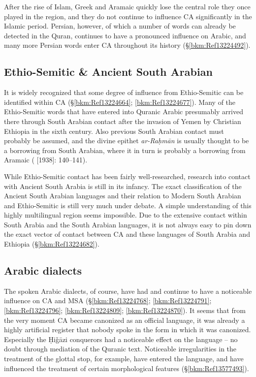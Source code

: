 \documentclass[output=paper]{langsci/langscibook}
\begin{document}
After the rise of Islam, Greek and Aramaic quickly lose the central role they once played in the region, and they do not continue to influence CA significantly in the Islamic period. Persian, however, of which a number of words can already be detected in the Quran, continues to have a pronounced influence on Arabic, and many more Persian words enter CA throughout its history (§\ref{bkm:Ref13224492}).

\subsection{Ethio-Semitic \& Ancient South Arabian}

It is widely recognized that some degree of influence from Ethio-Semitic can be identified within CA (§\ref{bkm:Ref13224664}; \ref{bkm:Ref13224677}). Many of the Ethio-Semitic words that have entered into Quranic Arabic presumably arrived there through South Arabian contact after the invasion of Yemen by Christian Ethiopia in the sixth century. Also previous South Arabian contact must probably be assumed, and the divine epithet \textit{ar-Raḥmān} is usually thought to be a borrowing from South Arabian, where it in turn is probably a borrowing from Aramaic (\citealt{Jeffrey2007} [1938]: 140--141). 

While Ethio-Semitic contact has been fairly well-researched, research into contact with Ancient South Arabia is still in its infancy. The exact classification of the Ancient South Arabian languages and their relation to Modern South Arabian and Ethio-Semitic is still very much under debate. A simple understanding of this highly multilingual region seems impossible. Due to the extensive contact within South Arabia and the South Arabian languages, it is not always easy to pin down the exact vector of contact between CA and these languages of South Arabia and Ethiopia (§\ref{bkm:Ref13224682}).

\subsection{\label{bkm:Ref13224768}Arabic dialects}

The spoken Arabic dialects, of course, have had and continue to have a noticeable influence on CA and MSA (§\ref{bkm:Ref13224768}; \ref{bkm:Ref13224791}; \ref{bkm:Ref13224796}; \ref{bkm:Ref13224809}; \ref{bkm:Ref13224870}). It seems that from the very moment CA became canonized as an official language, it was already a highly artificial register that nobody spoke in the form in which it was canonized. Especially the Ḥiǧāzi conquerors had a noticeable effect on the language – no doubt through mediation of the Quranic text. Noticeable irregularities in the treatment of the glottal stop, for example, have entered the language, and have influenced the treatment of certain morphological features (§\ref{bkm:Ref13577493}).
\end{document}

